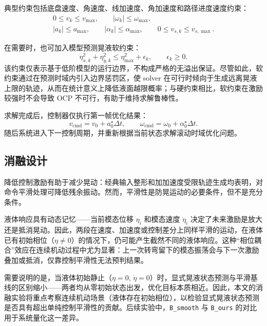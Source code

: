 \documentclass[12pt,a4paper]{ctexart}
\begin{document}
典型约束包括底盘速度、角速度、线加速度、角加速度和路径进度速度约束：
\begin{align}
  0 \leq v_k \leq v_{\max}, \qquad
  |\omega_k| \leq \omega_{\max}, \\
  |a_k| \leq a_{\max}, \qquad
  |\alpha_k| \leq \alpha_{\max}, \qquad
  0 \leq v_{s,k} \leq v_{s,\max} .
\end{align}

在需要时，也可加入模型预测晃液软约束：
\begin{equation}
  \eta_{x,k}^{2}+\eta_{y,k}^{2} \leq \eta_{\max}^{2}+\epsilon_k,
  \qquad \epsilon_k\geq 0.
\end{equation}
该约束仅表示基于低阶模型的运行边界，不构成严格的无溢出保证。尽管如此，软约束通过在预测时域内引入边界惩罚区，使 solver 在可行时倾向于生成远离晃液上限的轨迹，从而在统计意义上降低液面越限概率；与硬约束相比，软约束在激励较强时不会导致 OCP 不可行，有助于维持求解鲁棒性。

求解完成后，控制器仅执行第一帧优化结果：
\begin{equation}
  v_{\mathrm{cmd}} = v_0+a_0^{\star}\Delta t,
  \qquad
  \omega_{\mathrm{cmd}}=\omega_0+\alpha_0^{\star}\Delta t.
\end{equation}
随后系统进入下一控制周期，并重新根据当前状态求解滚动时域优化问题。


\subsection{消融设计}
\label{subsec:ablation-design}

降低控制激励有助于减少晃动：经典输入整形\cite{A07_Singer1990}和加加速度受限轨迹生成\cite{D13_Berscheid2021}均表明，对命令平滑处理可降低残余振动。然而，平滑性是防晃运动的必要条件，但不是充分条件。

液体响应具有动态记忆——当前模态位移 $\eta_i$ 和模态速度 $\dot\eta_i$ 决定了未来激励是放大还是抵消晃动。因此，两段在速度、加速度或控制差分上同样平滑的运动，在液体已有初始相位（$\eta\neq 0$）的情况下，仍可能产生截然不同的液体响应。这种“相位耦合”效应在连续机动过程中尤为显著：上一次转弯留下的模态振荡会与下一次激励叠加或抵消，仅靠控制平滑性无法预判结果。

需要说明的是，当液体初始静止（$\eta=0,\,\dot\eta=0$）时，显式晃液状态预测与平滑基线的区别缩小——两者均从零初始状态出发，优化目标本质相近。因此，本文的消融实验将重点考察连续机动场景（液体存在初始相位），以检验显式晃液状态预测是否具有超出单纯控制平滑性的贡献。后续实验中，\texttt{B\_smooth} 与 \texttt{B\_ours} 的对比用于系统量化这一差异。
\end{document}

